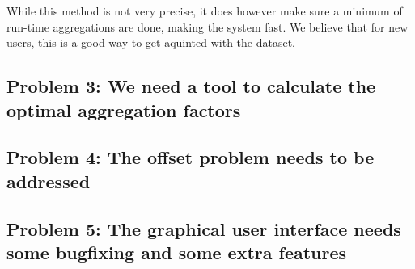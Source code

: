 While this method is not very precise, it does however make sure a minimum of run-time aggregations are done, making the system fast. We believe that for new users, this is a good way to get aquinted with the dataset.
\subsection{Problem 3: We need a tool to calculate the optimal aggregation factors}
\subsection{Problem 4: The offset problem needs to be addressed}
\subsection{Problem 5: The graphical user interface needs some bugfixing and some extra features}